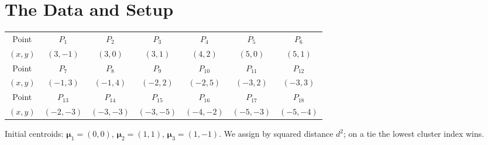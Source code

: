\documentclass[11pt,a4paper]{report}
\theoremstyle{definition}
\theoremstyle{plain}
\theoremstyle{remark}
\newcommand{\vmu}{\bm{\mu}}
\begin{document}
	\section{The Data and Setup}
	\begin{center}
	\begin{tabular}{@{}c|cccccc@{}}
	\toprule
	Point & $P_1$ & $P_2$ & $P_3$ & $P_4$ & $P_5$ & $P_6$\\
	$(x,y)$ & $(3,-1)$ & $(3,0)$ & $(3,1)$ & $(4,2)$ & $(5,0)$ & $(5,1)$\\
	\midrule
	Point & $P_7$ & $P_8$ & $P_9$ & $P_{10}$ & $P_{11}$ & $P_{12}$\\
	$(x,y)$ & $(-1,3)$ & $(-1,4)$ & $(-2,2)$ & $(-2,5)$ & $(-3,2)$ & $(-3,3)$\\
	\midrule
	Point & $P_{13}$ & $P_{14}$ & $P_{15}$ & $P_{16}$ & $P_{17}$ & $P_{18}$\\
	$(x,y)$ & $(-2,-3)$ & $(-3,-3)$ & $(-3,-5)$ & $(-4,-2)$ & $(-5,-3)$ & $(-5,-4)$\\
	\bottomrule
	\end{tabular}
	\end{center}
	Initial centroids: $\vmu_1=(0,0)$, $\vmu_2=(1,1)$, $\vmu_3=(1,-1)$. We assign by
	squared distance $d^2$; on a tie the lowest cluster index wins.
	
\end{document}
